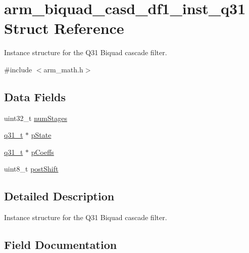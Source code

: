 \hypertarget{structarm__biquad__casd__df1__inst__q31}{}\section{arm\+\_\+biquad\+\_\+casd\+\_\+df1\+\_\+inst\+\_\+q31 Struct Reference}
\label{structarm__biquad__casd__df1__inst__q31}


Instance structure for the Q31 Biquad cascade filter.  




{\ttfamily \#include $<$arm\+\_\+math.\+h$>$}

\subsection*{Data Fields}
\begin{DoxyCompactItemize}
\item 
uint32\+\_\+t \mbox{\hyperlink{structarm__biquad__casd__df1__inst__q31_aed9c8a6224cd149e8e12b17b25b9b767}{num\+Stages}}
\item 
\mbox{\hyperlink{arm__math_8h_adc89a3547f5324b7b3b95adec3806bc0}{q31\+\_\+t}} $\ast$ \mbox{\hyperlink{structarm__biquad__casd__df1__inst__q31_adee4ba3ee8869865af7d8fa08ca913d6}{p\+State}}
\item 
\mbox{\hyperlink{arm__math_8h_adc89a3547f5324b7b3b95adec3806bc0}{q31\+\_\+t}} $\ast$ \mbox{\hyperlink{structarm__biquad__casd__df1__inst__q31_a68888e36167d81cb7836db10367a1682}{p\+Coeffs}}
\item 
uint8\+\_\+t \mbox{\hyperlink{structarm__biquad__casd__df1__inst__q31_a74050e9f36542bd56f4052381a82ae8f}{post\+Shift}}
\end{DoxyCompactItemize}


\subsection{Detailed Description}
Instance structure for the Q31 Biquad cascade filter. 

\subsection{Field Documentation}
\mbox{\label{structarm__biquad__casd__df1__inst__q31_aed9c8a6224cd149e8e12b17b25b9b767}} 
